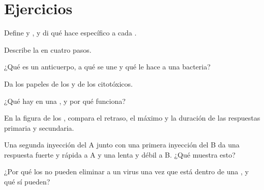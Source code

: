 \section{Ejercicios}

\begin{exercise}[$\star$]\label{exo:g12:adaptive-immunity:1}
Define  y , y di qué hace específico a cada .
\end{exercise}

\begin{exercise}[$\star$]\label{exo:g12:adaptive-immunity:2}
Describe la  en cuatro pasos.
\end{exercise}

\begin{exercise}[$\star$]\label{exo:g12:adaptive-immunity:3}
¿Qué es un anticuerpo, a qué se une y qué le hace a una bacteria?
\end{exercise}

\begin{exercise}[$\star$]\label{exo:g12:adaptive-immunity:4}
Da los papeles de los  y de los citotóxicos.
\end{exercise}

\begin{exercise}[$\star$]\label{exo:g12:adaptive-immunity:5}
¿Qué hay en una , y por qué funciona?
\end{exercise}

\begin{exercise}[$\star\star$]\label{exo:g12:adaptive-immunity:6}
En la figura de los , compara el retraso, el máximo y la
duración de las respuestas primaria y secundaria.
\end{exercise}

\begin{exercise}[$\star\star$]\label{exo:g12:adaptive-immunity:7}
Una segunda inyección del  A junto con una primera inyección
del  B da una respuesta fuerte y rápida a A y una lenta y débil
a B. ¿Qué muestra esto?
\end{exercise}

\begin{exercise}[$\star\star$]\label{exo:g12:adaptive-immunity:8}
¿Por qué los  no pueden eliminar a un virus una vez que está
dentro de una , y qué  sí pueden?
\end{exercise}

